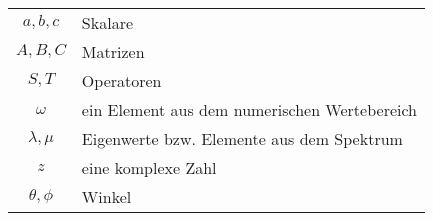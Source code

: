 \begin{center}
    \renewcommand{\arraystretch}{1.5}
    \begin{tabular}{c l}
        $a, b, c$ & Skalare \\
        $A, B, C$ & Matrizen \\
        $S, T$ & Operatoren \\
        $\omega$ & ein Element aus dem numerischen Wertebereich \\
        $\lambda, \mu$ & Eigenwerte bzw. Elemente aus dem Spektrum \\
        $z$ & eine komplexe Zahl \\
        $\theta, \phi$ & Winkel \\


    \end{tabular}
\end{center}
